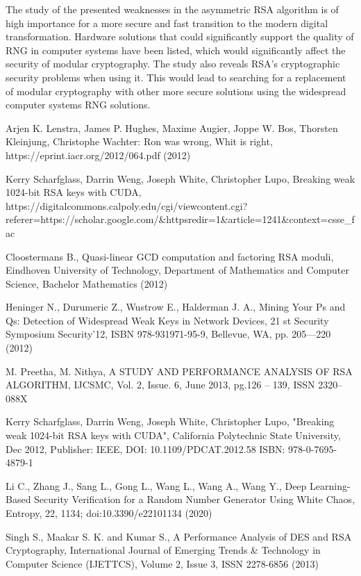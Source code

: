 \documentclass[runningheads]{llncs}
\begin{document}
The study of the presented weaknesses in the asymmetric RSA algorithm is of high importance for a more secure and fast transition to the modern digital transformation. Hardware solutions that could significantly support the quality of RNG in computer systems have been listed, which would significantly affect the security of modular cryptography. The study also reveals RSA's cryptographic security problems when using it. This would lead to searching for a replacement of modular cryptography with other more secure solutions using the widespread computer systems RNG solutions.

\begin{thebibliography}{8}

 Arjen K. Lenstra, James P. Hughes, Maxime Augier, Joppe W. Bos, Thorsten Kleinjung, Christophe Wachter: Ron was wrong, Whit is right, https://eprint.iacr.org/2012/064.pdf (2012)

 Kerry Scharfglass, Darrin Weng, Joseph White, Christopher Lupo, Breaking weak 1024-bit RSA keys with CUDA, https://digitalcommons.calpoly.edu/cgi/viewcontent.cgi? referer=https://scholar.google.com/\&httpsredir=1\&article=1241\&context=csse\_fac

 Cloostermans B., Quasi-linear GCD computation and factoring RSA moduli, Eindhoven University of Technology, Department of Mathematics and Computer Science, Bachelor Mathematics (2012)

 Heninger N., Durumeric Z., Wustrow E., Halderman J. A., Mining Your Ps and Qs: Detection of Widespread Weak Keys in Network Devices, 21 st Security Symposium Security’12, ISBN 978-931971-95-9, Bellevue, WA, pp. 205—220 (2012)

 M. Preetha, M. Nithya, A STUDY AND PERFORMANCE ANALYSIS OF RSA ALGORITHM, IJCSMC, Vol. 2, Issue. 6, June 2013, pg.126 – 139, ISSN 2320–088X

 Kerry Scharfglass, Darrin Weng, Joseph White, Christopher Lupo, "Breaking weak 1024-bit RSA keys with CUDA", California Polytechnic State University, Dec 2012, Publisher: IEEE, DOI: 10.1109/PDCAT.2012.58 ISBN: 978-0-7695-4879-1

 Li C., Zhang J., Sang L., Gong L., Wang L., Wang A., Wang Y., Deep Learning- Based Security Verification for a Random Number Generator Using White Chaos, Entropy, 22, 1134; doi:10.3390/e22101134 (2020)

 Singh S., Maakar S. K. and Kumar S., A Performance Analysis of DES and RSA Cryptography, International Journal of Emerging Trends \& Technology in Computer Science (IJETTCS), Volume 2, Issue 3, ISSN 2278-6856 (2013)


\end{thebibliography}
\end{document}
